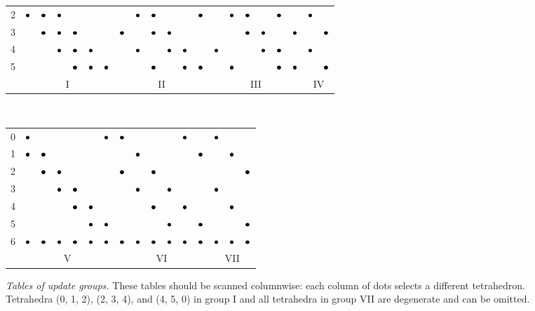 \documentclass[smallcondensed]{svjour3}
\begin{document}
\begin{figure}
{\begin{tabular}{c|cccccc|cccccc|cccccc|cc}
      2 & $\bullet$ & $\bullet$ & $\bullet$ & & & & & $\bullet$ & $\bullet$ & & & $\bullet$ & & $\bullet$ & $\bullet$ & & $\bullet$ & & $\bullet$ & \\
      3 & & $\bullet$ & $\bullet$ & $\bullet$ & & & $\bullet$ & & $\bullet$ & $\bullet$ & & & & & $\bullet$ & $\bullet$ & & $\bullet$ & & $\bullet$ \\
      4 & & & $\bullet$ & $\bullet$ & $\bullet$ & & & $\bullet$ & & $\bullet$ & $\bullet$ & & $\bullet$ & & & $\bullet$ & $\bullet$ & & $\bullet$ & \\
      5 & & & & $\bullet$ & $\bullet$ & $\bullet$ & & & $\bullet$ & & $\bullet$ & $\bullet$ & & $\bullet$ & & & $\bullet$ & $\bullet$ & & $\bullet$ \\
      \multicolumn{1}{c}{} & \multicolumn{6}{c}{I} & \multicolumn{6}{c}{II} & \multicolumn{6}{c}{III} & \multicolumn{2}{c}{IV}
    \end{tabular} \\
    \vspace{1em}
    \begin{tabular}{c|cccccc|cccccc|ccc}
      0 & $\bullet$ & & & & & $\bullet$ & $\bullet$ & & & & $\bullet$ & & $\bullet$ & & \\
      1 & $\bullet$ & $\bullet$ & & & & & & $\bullet$ & & & & $\bullet$ & & $\bullet$ & \\
      2 & & $\bullet$ & $\bullet$ & & & & $\bullet$ & & $\bullet$ & & & & & & $\bullet$ \\
      3 & & & $\bullet$ & $\bullet$ & & & & $\bullet$ & & $\bullet$ & & & $\bullet$ & & \\
      4 & & & & $\bullet$ & $\bullet$ & & & & $\bullet$ & & $\bullet$ & & & $\bullet$ & \\
      5 & & & & & $\bullet$ & $\bullet$ & & & & $\bullet$ & & $\bullet$ & & & $\bullet$ \\
      6 & $\bullet$ & $\bullet$ & $\bullet$ & $\bullet$ & $\bullet$ & $\bullet$ & $\bullet$ & $\bullet$ & $\bullet$ & $\bullet$ & $\bullet$ & $\bullet$ & $\bullet$ & $\bullet$ & $\bullet$ \\
      \multicolumn{1}{c}{} & \multicolumn{6}{c}{V} & \multicolumn{6}{c}{VI} & \multicolumn{3}{c}{VII}
    \end{tabular}%
  }
  \caption{\emph{Tables of update groups.} These tables should be
    scanned columnwise: each column of dots selects a different
    tetrahedron. Tetrahedra (0, 1, 2), (2, 3, 4), and (4, 5, 0) in
    group I and all tetrahedra in group VII are degenerate and can be
    omitted.}\label{fig:tetrahedra-groups}
\end{figure}
\end{document}
